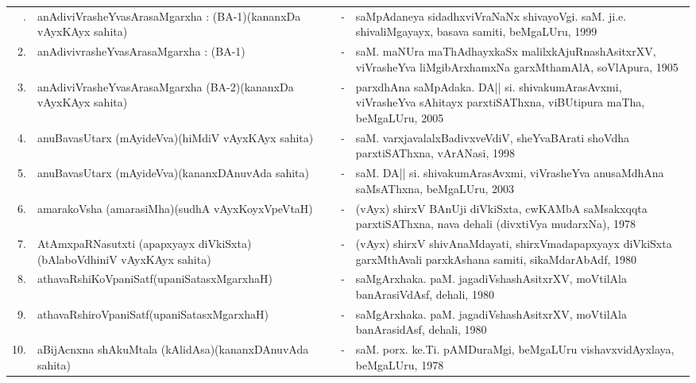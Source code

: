 {\renewcommand{\arraystretch}{1.3}
\begin{longtable}{rp{6cm}cp{9cm}<{\raggedright}}
\hline
\endfirsthead
\hline
\endhead
\hline
\endfoot
\endlastfoot
1. & anAdiviVrasheYvasArasaMgarxha : (BA-1)\newline (kananxDa vAyxKAyx sahita) &-& saMpAdaneya sidadhxviVraNaNx shivayoVgi. saM. ji.e. shivaliMgayayx, basava samiti, beMgaLUru, 1999\\
2. & anAdivivrasheYvasArasaMgarxha : (BA-1) &-& saM. maNUra maThAdhayxkaSx malilxkAjuRnashAsitxrXV, viVrasheYva liMgibArxhamxNa garxMthamAlA, soVlApura, 1905\\
3. & anAdiviVrasheYvasArasaMgarxha (BA-2)\newline (kananxDa vAyxKAyx sahita) &-& parxdhAna saMpAdaka. DA|| si. shivakumArasAvxmi, viVrasheYva sAhitayx parxtiSAThxna, viBUtipura maTha, beMgaLUru, 2005\\
4. & anuBavasUtarx (mAyideVva)\newline (hiMdiV vAyxKAyx sahita) &-& saM. varxjavalalxBadivxveVdiV, sheYvaBArati shoVdha parxtiSAThxna, vArANasi, 1998\\
5. & anuBavasUtarx (mAyideVva)\newline (kananxDAnuvAda sahita) &-& saM. DA|| si. shivakumArasAvxmi, viVrasheYva anusaMdhAna saMsAThxna, beMgaLUru, 2003\\
6. & amarakoVsha (amarasiMha)\newline (sudhA vAyxKoyxVpeVtaH) &-& (vAyx) shirxV BAnUji diVkiSxta, cwKAMbA saMsakxqqta parxtiSAThxna, nava dehali (divxtiVya mudarxNa), 1978\\
7. & AtAmxpaRNasutxti (apapxyayx diVkiSxta)\newline (bAlaboVdhiniV vAyxKAyx sahita) &-& (vAyx) shirxV shivAnaMdayati, shirxVmadapapxyayx diVkiSxta garxMthAvali parxkAshana samiti, sikaMdarAbAdf, 1980\\
8. & athavaRshiKoVpaniSatf\newline (upaniSatasxMgarxhaH) &-& saMgArxhaka. paM. jagadiVshashAsitxrXV, moVtilAla banArasiVdAsf, dehali, 1980\\
9. & athavaRshiroVpaniSatf\newline (upaniSatasxMgarxhaH) &-& saMgArxhaka. paM. jagadiVshashAsitxrXV, moVtilAla banArasidAsf, dehali, 1980\\
10. & aBijAcnxna shAkuMtala (kAlidAsa)\newline (kananxDAnuvAda sahita) &-& saM. porx. ke.Ti. pAMDuraMgi, beMgaLUru vishavxvidAyxlaya, beMgaLUru, 1978\\

\end{longtable}}
